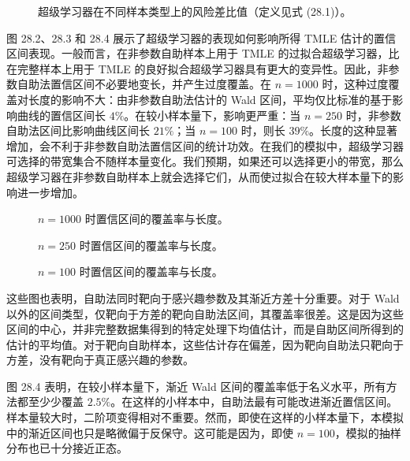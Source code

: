 \begin{figure}[htbp]
\centering

\caption{超级学习器在不同样本类型上的风险差比值（定义见式 (28.1)）。}
\label{fig:ch28-risk-ratio}
\end{figure}

图 28.2、28.3 和 28.4 展示了超级学习器的表现如何影响所得 TMLE 估计的置信区间表现。一般而言，在非参数自助样本上用于 TMLE 的过拟合超级学习器，比在完整样本上用于 TMLE 的良好拟合超级学习器具有更大的变异性。因此，非参数自助法置信区间不必要地变长，并产生过度覆盖。在 $n=1000$ 时，这种过度覆盖对长度的影响不大：由非参数自助法估计的 Wald 区间，平均仅比标准的基于影响曲线的置信区间长 $4\%$。在较小样本量下，影响更严重：当 $n=250$ 时，非参数自助法区间比影响曲线区间长 $21\%$；当 $n=100$ 时，则长 $39\%$。长度的这种显著增加，会不利于非参数自助法置信区间的统计功效。在我们的模拟中，超级学习器可选择的带宽集合不随样本量变化。我们预期，如果还可以选择更小的带宽，那么超级学习器在非参数自助样本上就会选择它们，从而使过拟合在较大样本量下的影响进一步增加。

\clearpage
\begin{landscape}
\begin{figure}[p]
\centering

\caption{$n=1000$ 时置信区间的覆盖率与长度。}
\label{fig:ch28-ci-1000}
\end{figure}
\end{landscape}

\begin{landscape}
\begin{figure}[p]
\centering

\caption{$n=250$ 时置信区间的覆盖率与长度。}
\label{fig:ch28-ci-250}
\end{figure}
\end{landscape}

\begin{landscape}
\begin{figure}[p]
\centering

\caption{$n=100$ 时置信区间的覆盖率与长度。}
\label{fig:ch28-ci-100}
\end{figure}
\end{landscape}

这些图也表明，自助法同时靶向于感兴趣参数及其渐近方差十分重要。对于 Wald 以外的区间类型，仅靶向于方差的靶向自助法区间，其覆盖率很差。这是因为这些区间的中心，并非完整数据集得到的特定处理下均值估计，而是自助区间所得到的估计的平均值。对于靶向自助样本，这些估计存在偏差，因为靶向自助法只靶向于方差，没有靶向于真正感兴趣的参数。

图 28.4 表明，在较小样本量下，渐近 Wald 区间的覆盖率低于名义水平，所有方法都至少少覆盖 $2.5\%$。在这样的小样本中，自助法最有可能改进渐近置信区间。样本量较大时，二阶项变得相对不重要。然而，即使在这样的小样本量下，本模拟中的渐近区间也只是略微偏于反保守。这可能是因为，即使 $n=100$，模拟的抽样分布也已十分接近正态。

